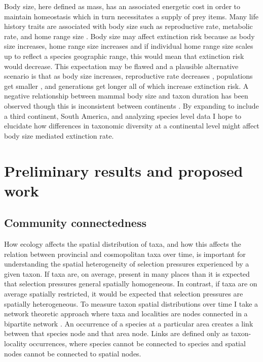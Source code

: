 \documentclass[11pt,letterpaper]{article}
\begin{document}
Body size, here defined as mass, has an associated energetic cost in order to maintain homeostasis which in turn necessitates a supply of prey items. Many life history traits are associated with body size such as reproductive rate, metabolic rate, and home range size \cite{Peters1983a,Damuth1979,Brown1987,Smith2004}. Body size may affect extinction risk because as body size increases, home range size increases \citep{Damuth1979} and if individual home range size scales up to reflect a species geographic range, this would mean that extinction risk would decrease. This expectation may be flawed and a plausible alternative scenario is that as body size increases, reproductive rate decreases \citep{Johnson2002b}, populations get smaller \citep{White2007}, and generations get longer \citep{Martin1993a} all of which increase extinction risk. A negative relationship between mammal body size and taxon duration has been observed \citep{Liow2008,Davidson2012} though this is inconsistent between continents \citep{Tomiya2013,Liow2008}. By expanding to include a third continent, South America, and analyzing species level data I hope to elucidate how differences in taxonomic diversity at a continental level might affect body size mediated extinction rate. 

\section{Preliminary results and proposed work}
\subsection{Community connectedness}
How ecology affects the spatial distribution of taxa, and how this affects the relation between provincial and cosmopolitan taxa over time, is important for understanding the spatial heterogeneity of selection pressures experienced by a given taxon. If taxa are, on average, present in many places than it is expected that selection pressures general spatially homogeneous. In contrast, if taxa are on average spatially restricted, it would be expected that selection pressures are spatially heterogeneous. To measure taxon spatial distributions over time I take a network theoretic approach where taxa and localities are nodes connected in a bipartite network \citep{Sidor2013,Vilhena2013,Vilhena2013b}. An occurrence of a species at a particular area creates a link between that species node and that area node. Links are defined only as taxon-locality occurrences, where species cannot be connected to species and spatial nodes cannot be connected to spatial nodes. %
\end{document}
